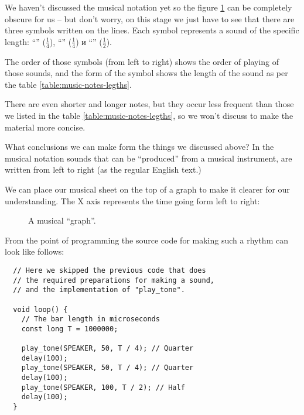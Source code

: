 \documentclass[../sparc.tex]{subfiles}
\begin{document}
We haven't discussed the musical notation yet so the figure
\ref{fig:lilypond-queen-1} can be completely obscure for us -- but don't worry,
on this stage we just have to see that there are three symbols written on the
lines.  Each symbol represents a sound of the specific length: ``\quarterNote''
($\frac{1}{4}$), ``\quarterNote'' ($\frac{1}{4}$) и ``\halfNote''
($\frac{1}{2}$).

The order of those symbols (from left to right) shows the order of playing of
those sounds, and the form of the symbol shows the length of the sound as per
the table \ref{table:music-notes-legths}.


There are even shorter and longer notes, but they occur less frequent than those
we listed in the table \ref{table:music-notes-legths}, so we won't discuss to
make the material more concise.

What conclusions we can make form the things we discussed above?  In the musical
notation sounds that can be ``produced'' from a musical instrument, are written
from left to right (as the regular English text.)

We can place our musical sheet on the top of a graph to make it clearer for our
understanding.  The $\mbox{X}$ axis represents the time going form left to
right:

\begin{figure}[ht]
  \centering

  \caption{A musical ``graph''.}
  \label{fig:lilypond-queen-1}
\end{figure}

From the point of programming the source code for making such a rhythm can look
like follows:

\begin{verbatim}
  // Here we skipped the previous code that does
  // the required preparations for making a sound,
  // and the implementation of "play_tone".

  void loop() {
    // The bar length in microseconds
    const long T = 1000000;

    play_tone(SPEAKER, 50, T / 4); // Quarter
    delay(100);
    play_tone(SPEAKER, 50, T / 4); // Quarter
    delay(100);
    play_tone(SPEAKER, 100, T / 2); // Half
    delay(100);
  }
\end{verbatim}
\end{document}
